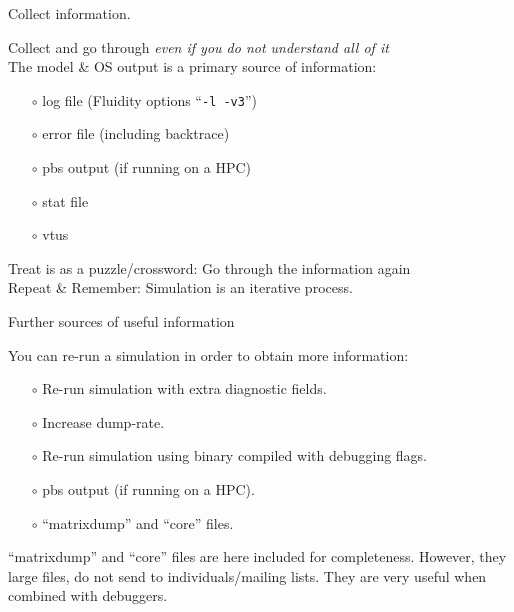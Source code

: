 \documentclass[t]{beamer}
\begin{document}
\begin{frame}{Collect information.}

Collect and go through \emph{even if you do not understand all of it}\\
\vspace{20pt}
The model \& OS output is a primary source of information:
\begin{itemize}
 \item[$\circ$] log file (Fluidity options ``{\tt -l -v3}'')
 \item[$\circ$] error file (including backtrace)
 \item[$\circ$] pbs output (if running on a HPC)
 \item[$\circ$] stat file
 \item[$\circ$] vtus
\end{itemize}
\vspace{20pt}
Treat is as a puzzle/crossword: Go through the information again\\
\vspace{20pt}
Repeat \& Remember: Simulation is an iterative process.

\end{frame}


\begin{frame}{Further sources of useful information}

You can re-run a simulation in order to obtain more information:
\vspace{1ex}

\begin{itemize}
 \item[$\circ$] Re-run simulation with extra diagnostic fields.
 \item[$\circ$] Increase dump-rate.
 \item[$\circ$] Re-run simulation using binary compiled with debugging flags.
 \item[$\circ$] pbs output (if running on a HPC).
 \item[$\circ$] ``matrixdump'' and ``core'' files.
\end{itemize}

``matrixdump'' and ``core'' files are here included for completeness. However, they
large files, do not send to individuals/mailing lists. They are very useful when combined
with debuggers.

\end{frame}
\end{document}
